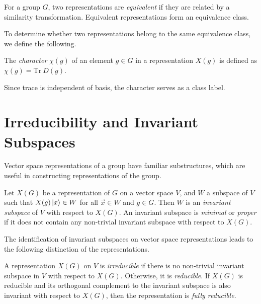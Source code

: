 \begin{definition}
    For a group $G$, two representations are \textit{equivalent} if they are related by a similarity transformation. Equivalent representations form an equivalence class.
\end{definition}

To determine whether two representations belong to the same equivalence class, we define the following.
\begin{definition}
    The \textit{character} $\chi(g)$ of an element $g\in G$ in a representation $X(g)$ is defined as $\chi(g) = \text{Tr}~D(g)$.
\end{definition}
Since trace is independent of basis, the character serves as a class label.

\section{Irreducibility and Invariant Subspaces}

Vector space representations of a group have familiar substructures, which are useful in constructing representations of the group.
\begin{definition}
    Let $X(G)$ be a representation of $G$ on a vector space $V$, and $W$ a subspace of $V$ such that $X(g)\ket{x}\in W$ for all $\vec{x}\in W$ and $g\in G$. Then $W$ is an \textit{invariant subspace} of $V$ with respect to $X(G)$. An invariant subspace is \textit{minimal} or \textit{proper} if it does not contain any non-trivial invariant subspace with respect to $X(G)$.
\end{definition}

The identification of invariant subspaces on vector space representations leads to the following distinction of the representations.
\begin{definition}
    A representation $X(G)$ on $V$ is \textit{irreducible} if there is no non-trivial invariant subspace in $V$ with respect to $X(G)$. Otherwise, it is \textit{reducible}. If $X(G)$ is reducible and its orthogonal complement to the invariant subspace is also invariant with respect to $X(G)$, then the representation is \textit{fully reducible}.
\end{definition}


